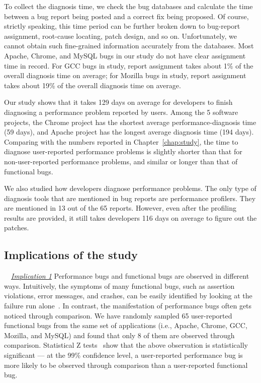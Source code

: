 To collect the diagnosis time, we check the bug databases and calculate the
time between a bug report being posted and a correct fix being proposed.
Of course, strictly speaking, this time period can be further broken down to
bug-report assignment, root-cause locating, patch design, and so on. 
Unfortunately, we cannot obtain such fine-grained information accurately
from the databases. Most Apache, Chrome, and MySQL bugs in
our study do not have clear assignment time in record. For GCC bugs in
study, report assignment takes about 1\% of the overall diagnosis
time on average; for Mozilla bugs in study, report assignment takes about
19\% of the overall diagnosis time on average.

Our study shows that it takes 129 days on average for developers to finish
diagnosing a performance problem reported by users.
Among the 5 software projects, the Chrome project has the shortest average
performance-diagnosis time (59 days), and Apache project has the longest
average diagnosis time (194 days).
Comparing with the numbers reported in Chapter~\ref{chap:study}, 
the time to diagnose user-reported performance problems is slightly shorter
than that for non-user-reported performance problems,
and similar or longer than that of 
functional bugs. 

We also studied how developers diagnose performance problems.
The only type of diagnosis tools that are mentioned in bug reports are
performance profilers. They are mentioned in 13 out of the 65 reports.
However, even after the profiling results are provided, it still takes
developers 116 days on average to figure out the patches.


\subsection{Implications of the study}
\label{sec:5_study_imp}

\ \ \underline{\textit{Implication 1}}
Performance bugs and functional bugs are observed in different ways.
Intuitively, the symptoms of many functional bugs, such as assertion violations,
error messages, and crashes, can be easily identified by looking
at the failure run alone~\citep{LiASID06}.
In contrast, the manifestation
of performance bugs often gets noticed through comparison.
We have randomly sampled 65 user-reported functional bugs from the same set
of applications (i.e., Apache, Chrome, GCC, Mozilla, and MySQL) and found that
only 8 of them are observed through comparison.
Statistical Z tests~\citep{ztest} show that the above observation is 
statistically
significant --- at the 99\% confidence level, 
a user-reported performance bug is more likely to be observed through 
comparison than a user-reported functional bug.

